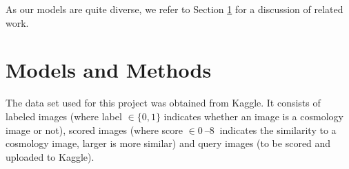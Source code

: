 \documentclass[10pt,conference,compsocconf]{IEEEtran}
\newcommand\TODO[1]{\textcolor{red}{#1}} %
\begin{document}
As our models are quite diverse, we refer to Section \ref{sec:models_methods} for a discussion of related work.






\section{Models and Methods} \label{sec:models_methods}
The data set used for this project was obtained from Kaggle. It consists of labeled images (where label $\in \{0,1\}$ indicates whether an image is a cosmology image or not), scored images (where score $\in \SIrange{0}{8}{}$ indicates the similarity to a cosmology image, larger is more similar) and query images (to be scored and uploaded to Kaggle). %
\end{document}
